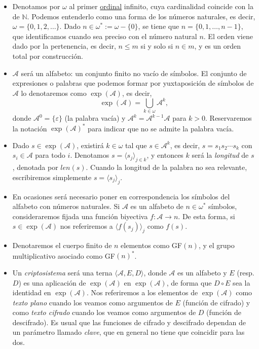 \documentclass[
  a4paper,
  spanish,
  12pt,
]{scrartcl}
\theoremstyle{ejercicio-style}
\theoremstyle{remark-style}
\theoremstyle{teorema-style}
\begin{document}
\begin{itemize}
\item Denotamos por $\omega$ al primer \href{https://en.wikipedia.org/wiki/Ordinal_number}{ordinal} infinito, cuya cardinalidad coincide con la de $\mathbb{N}$. Podemos entenderlo como una forma de  los números naturales, es decir, $\omega = \{0,1,2, \dots \}$. Dado $n \in \omega^\ast := \omega - \{0\}$, se tiene que $n = \{0, 1, \dots, n-1\}$, que identificamos cuando sea preciso con el número natural $n$. El orden viene dado por la pertenencia, es decir, $n\le m$ si y solo si $n\in m$, y es un orden total por construcción.

\item $\mathcal{A}$ será un alfabeto: un conjunto finito no vacío de símbolos. El conjunto de expresiones o palabras que podemos formar por yuxtaposición de símbolos de $\mathcal{A}$ lo denotaremos como $\exp(\mathcal{A})$, es decir, \[ \exp(\mathcal{A}) = \bigcup_{k \in \omega} \mathcal{A}^k,\] donde $\mathcal{A}^0 = \{\varepsilon\}$ (la palabra vacía) y $\mathcal{A}^k = \mathcal{A}^{k-1}\mathcal{A}$ para $k > 0$. Reservaremos la notación $\exp(\mathcal{A})^\ast$ para indicar que no se admite la palabra vacía.

\item Dado $s \in \exp(\mathcal{A})$, existirá $k \in \omega$ tal que $s \in \mathcal{A}^k$, es decir, $s = s_1s_2\cdots s_k$ con $s_i \in \mathcal{A}$ para todo $i$. Denotamos $s = \langle s_j \rangle_{j \in k}$, y entonces $k$ será la \textit{longitud} de $s$, denotada por $len(s)$. Cuando la longitud de la palabra no sea relevante, escribiremos simplemente $s = \langle s_j \rangle_{j}$.

\item En ocasiones será necesario poner en correspondencia los símbolos del alfabeto con números naturales. Si $\mathcal{A}$ es un alfabeto de $n \in \omega^\ast$ símbolos, consideraremos fijada una función biyectiva $f: \mathcal{A} \to n$. De esta forma, si $s \in \exp(\mathcal{A})$ nos referiremos a $\langle f(s_j) \rangle_j$ como $f(s)$.

\item Denotaremos el cuerpo finito de $n$ elementos como GF$(n)$, y el grupo multiplicativo asociado como GF$(n)^\ast$.

\item Un \textit{criptosistema} será una terna $\langle \mathcal{A}, E, D \rangle$, donde $\mathcal{A}$ es un alfabeto y $E$ (resp. $D$) es una aplicación de $\exp(\mathcal{A})$ en $\exp(\mathcal{A})$, de forma que $D \circ E$ sea la identidad en $\exp(\mathcal{A})$. Nos referiremos a los elementos de $\exp(\mathcal{A})$ como \textit{texto plano} cuando los veamos como argumentos de $E$ (función de cifrado) y como \textit{texto cifrado} cuando los veamos como argumentos de $D$ (función de descifrado). Es usual que las funciones de cifrado y descifrado dependan de un parámetro llamado \textit{clave}, que en general no tiene que coincidir para las dos.
\end{itemize}
\end{document}
